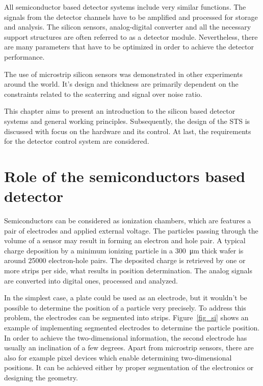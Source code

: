 
All semiconductor based detector systems include very similar functions. The signals from the detector channels have to be amplified and processed for storage and analysis. The silicon sensors, analog-digital converter and all the necessary support structures are often referred to as a detector module. Nevertheless, there are many parameters that have to be optimized in order to achieve the detector performance.

The use of microstrip silicon sensors was demonstrated in other experiments around the world. It's design and thickness are primarily dependent on the constraints related to the scaterring and signal over noise ratio. 

This chapter aims to present an introduction to the silicon based detector systems and general working principles. Subsequently, the design of the \gls{STS} is discussed with focus on the hardware and its control. At last, the requirements for the detector control system are considered. 

\section{Role of the semiconductors based detector}

Semiconductors can be considered as ionization chambers, which are features a pair of electrodes and applied external voltage. The particles passing through the volume of a sensor may result in forming an electron and hole pair. A typical charge deposition by a minimum ionizing particle in a \SI{300}{\micro\metre} thick wafer is around 25000 electron-hole pairs. The deposited charge is retrieved by one or more strips per side, what results in position determination. The analog signals are converted into digital ones, processed and analyzed.

In the simplest case, a plate could be used as an electrode, but it wouldn't be possible to determine the position of a particle very precisely. To address this problem, the electrodes can be segmented into strips. Figure~\ref{fig_si} shows an example of implementing segmented electrodes to determine the particle position. In order to achieve the two-dimensional information, the second electrode has usually an inclination of a few degrees. Apart from microstrip sensors, there are also for example pixel devices which enable determining two-dimensional positions. It can be achieved either by proper segmentation of the electronics or designing the geometry.  

